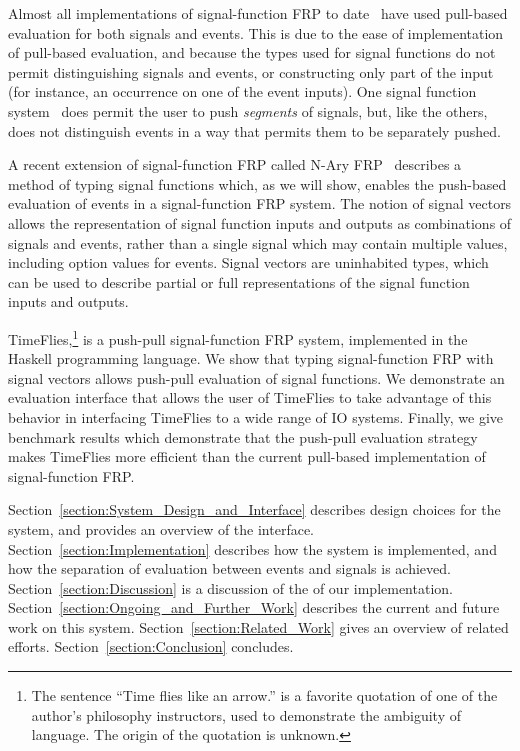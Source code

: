 Almost all implementations of signal-function FRP to date~\cite{Courtney2001-1,Nilsson2002,Nilsson2005,Sculthorpe2011}
have used pull-based evaluation for both signals and events. This is due to the
ease of implementation of pull-based evaluation, and because the types used for
signal functions do not permit distinguishing signals and events, or
constructing only part of the input (for instance, an occurrence on one of the
event inputs). One signal function system~\cite{Jeffery2012} does permit the
user to push {\em segments} of signals, but, like the others, does not
distinguish events in a way that permits them to be separately pushed.

A recent extension of signal-function FRP called N-Ary FRP~\cite{Sculthorpe2011}
describes a method of typing signal functions which, as we will show, enables
the push-based evaluation of events in a signal-function FRP system. The notion
of signal vectors allows the representation of signal function inputs and
outputs as combinations of signals and events, rather than a single signal which
may contain multiple values, including option values for events. Signal vectors
are uninhabited types, which can be used to describe partial or full representations
of the signal function inputs and outputs.

TimeFlies,\footnote{The sentence ``Time flies like an arrow.'' is a 
favorite quotation of one of the author's philosophy instructors, used to
demonstrate the ambiguity of language. The origin of the quotation is unknown.}
is a push-pull signal-function FRP system, implemented in the Haskell
programming language. We show that typing signal-function FRP with signal
vectors allows push-pull evaluation of signal functions. We demonstrate an
evaluation interface that allows the user of TimeFlies to take advantage of this
behavior in interfacing TimeFlies to a wide range of IO systems. Finally, we
give benchmark results which demonstrate that the push-pull evaluation strategy
makes TimeFlies more efficient than the current pull-based implementation of
signal-function FRP.

Section~\ref{section:System_Design_and_Interface} describes design choices for the system,
and provides an overview of the interface. Section~\ref{section:Implementation}
describes how the system is implemented, and how the separation of evaluation
between events and signals is achieved. Section~\ref{section:Discussion} is a
discussion of the   of our implementation. 
Section~\ref{section:Ongoing_and_Further_Work} describes the current and future
work on this system. Section~\ref{section:Related_Work} gives an overview of
related efforts. Section~\ref{section:Conclusion} concludes.


